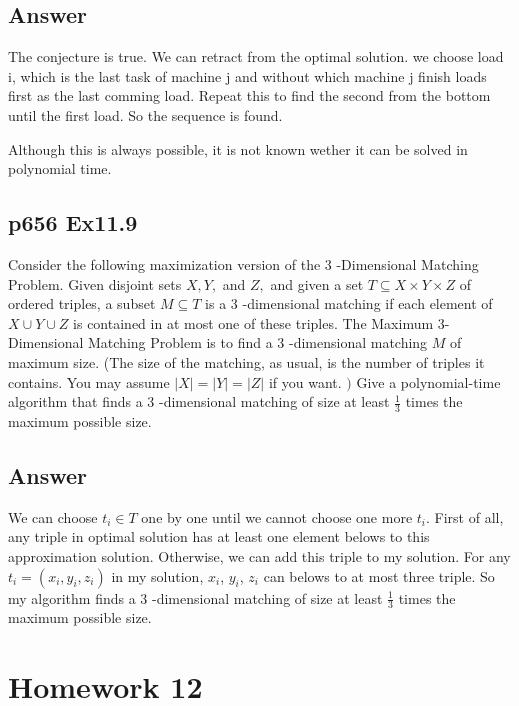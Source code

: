 \documentclass[a4paper]{article}
\begin{document}
\subsection*{Answer}
The conjecture is true. We can retract from the optimal solution. we choose load i, which is the last task of machine j and without which machine j finish loads first as the last comming load. Repeat this to find the second from the bottom until the first load. So the sequence is found.

Although this is always possible, it is not known wether it can be solved in polynomial time.
\vspace*{2cm}


\subsection*{p656 Ex11.9}
\begin{adjustwidth}{1cm}{1cm}
	Consider the following maximization version of the 3 -Dimensional Matching Problem. Given disjoint sets $X, Y,$ and $Z,$ and given a set $T \subseteq X \times Y \times Z$ of ordered triples, a subset $M \subseteq T$ is a 3 -dimensional matching if each element of $X \cup Y \cup Z$ is contained in at most one of these triples. The Maximum 3-Dimensional Matching Problem is to find a 3 -dimensional matching $M$ of maximum size. (The size of the matching, as usual, is the number of triples it contains. You may assume $|X|=|Y|=|Z|$ if you want. $)$
	Give a polynomial-time algorithm that finds a 3 -dimensional matching of size at least $\frac{1}{3}$ times the maximum possible size.
\end{adjustwidth}
\subsection*{Answer}
We can choose $t_i \in T$ one by one until we cannot choose one more $t_i$. First of all, any triple in optimal solution has at least one element belows to this approximation solution. Otherwise, we can add this triple to my solution. For any $t_i = (x_i,y_i,z_i)$ in my solution, $x_i$, $y_i$, $z_i$ can belows to at most three triple. So my algorithm finds a 3 -dimensional matching of size at least $\frac{1}{3}$ times the maximum possible size.



\newpage
\section*{Homework 12}
\end{document}
